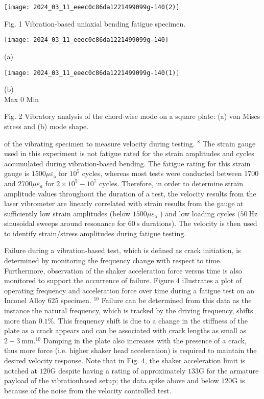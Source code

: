\documentclass[10pt]{article}
\begin{document}
\begin{center}
\texttt{[image: 2024\_03\_11\_eeec0c86da1221499099g-140(2)]}
\end{center}

Fig. 1 Vibration-based uniaxial bending fatigue specimen.

\begin{center}
\texttt{[image: 2024\_03\_11\_eeec0c86da1221499099g-140]}
\end{center}

(a)

\begin{center}
\texttt{[image: 2024\_03\_11\_eeec0c86da1221499099g-140(1)]}
\end{center}

(b)\\
Max 0 Min

Fig. 2 Vibratory analysis of the chord-wise mode on a square plate: (a) von Mises stress and (b) mode shape.

of the vibrating specimen to measure velocity during testing. ${ }^{8}$ The strain gauge used in this experiment is not fatigue rated for the strain amplitudes and cycles accumulated during vibration-based bending. The fatigue rating for this strain gauge is $1500 \mu \varepsilon_{\mathrm{a}}$ for $10^{5}$ cycles, whereas most tests were conducted between 1700 and $2700 \mu \varepsilon_{a}$ for $2 \times 10^{5}-10^{7}$ cycles. Therefore, in order to determine strain amplitude values throughout the duration of a test, the velocity results from the laser vibrometer are linearly correlated with strain results from the gauge at sufficiently low strain amplitudes (below $1500 \mu \varepsilon_{\mathrm{a}}$ ) and low loading cycles $(50 \mathrm{~Hz}$ sinusoidal sweeps around resonance for $60 \mathrm{~s}$ durations). The velocity is then used to identify strain/stress amplitudes during fatigue testing.

Failure during a vibration-based test, which is defined as crack initiation, is determined by monitoring the frequency change with respect to time. Furthermore, observation of the shaker acceleration force versus time is also monitored to support the occurrence of failure. Figure 4 illustrates a plot of operating frequency and acceleration force over time during a fatigue test on an Inconel Alloy 625 specimen. ${ }^{10}$ Failure can be determined from this data as the instance the natural frequency, which is tracked by the driving frequency, shifts more than $0.1 \%$. This frequency shift is due to a change in the stiffness of the plate as a crack appears and can be associated with crack lengths as small as $2-3 \mathrm{~mm} .{ }^{10}$ Damping in the plate also increases with the presence of a crack, thus more force (i.e. higher shaker head acceleration) is required to maintain the desired velocity response. Note that in Fig. 4, the shaker acceleration limit is notched at $120 \mathrm{G}$ despite having a rating of approximately $133 \mathrm{G}$ for the armature payload of the vibrationbased setup; the data spike above and below $120 \mathrm{G}$ is because of the noise from the velocity controlled test.
\end{document}
